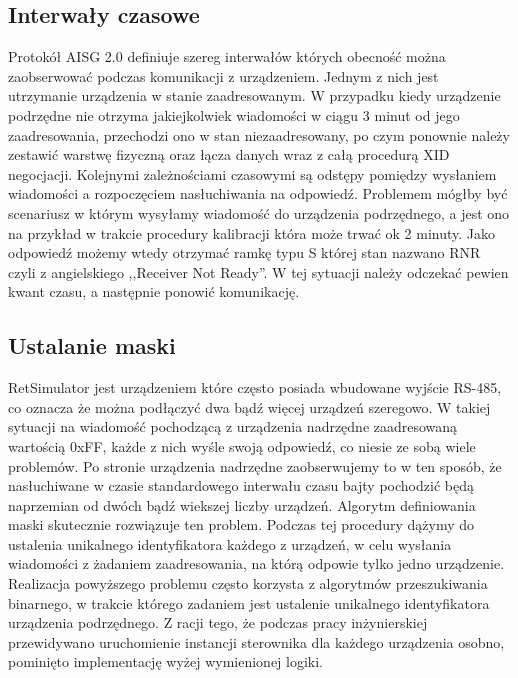     \subsection{Interwały czasowe}
    Protokół AISG 2.0 definiuje szereg interwałów których obecność można zaobserwować podczas komunikacji z urządzeniem. Jednym z nich jest
    utrzymanie urządzenia w stanie zaadresowanym. W przypadku kiedy urządzenie podrzędne nie otrzyma jakiejkolwiek wiadomości w ciągu 3 minut
    od jego zaadresowania, przechodzi ono w stan niezaadresowany, po czym ponownie należy zestawić warstwę fizyczną oraz łącza danych wraz
    z całą procedurą XID negocjacji. Kolejnymi zależnościami czasowymi są odstępy pomiędzy wysłaniem wiadomości a rozpoczęciem nasłuchiwania na odpowiedź.
    Problemem mógłby być scenariusz w którym wysyłamy wiadomość do urządzenia podrzędnego, a jest ono na przykład w trakcie procedury kalibracji która może 
    trwać ok 2 minuty. Jako odpowiedź możemy wtedy otrzymać ramkę typu S której stan nazwano RNR czyli z angielskiego ,,Receiver Not Ready''. 
    W tej sytuacji należy odczekać pewien kwant czasu, a następnie ponowić komunikację.
    \subsection{Ustalanie maski}
    RetSimulator jest urządzeniem które często posiada wbudowane wyjście RS-485, co oznacza że można podłączyć dwa bądź więcej urządzeń szeregowo. 
    W takiej sytuacji na wiadomość pochodzącą z urządzenia nadrzędne zaadresowaną wartością 0xFF, każde z nich wyśle swoją odpowiedź, co niesie ze sobą wiele problemów.
    Po stronie urządzenia nadrzędne zaobserwujemy to w ten sposób, że nasłuchiwane w czasie standardowego interwału czasu bajty
    pochodzić będą naprzemian od dwóch bądź wiekszej liczby urządzeń. Algorytm definiowania maski skutecznie rozwiązuje ten problem. 
    Podczas tej procedury dążymy do ustalenia unikalnego identyfikatora każdego z urządzeń, w celu wysłania wiadomości z żadaniem zaadresowania,
    na którą odpowie tylko jedno urządzenie. Realizacja powyższego problemu często korzysta z algorytmów przeszukiwania binarnego, w trakcie którego
    zadaniem jest ustalenie unikalnego identyfikatora urządzenia podrzędnego. Z racji tego, że podczas pracy inżynierskiej
    przewidywano uruchomienie instancji sterownika dla każdego urządzenia osobno, pominięto implementację wyżej wymienionej logiki.
